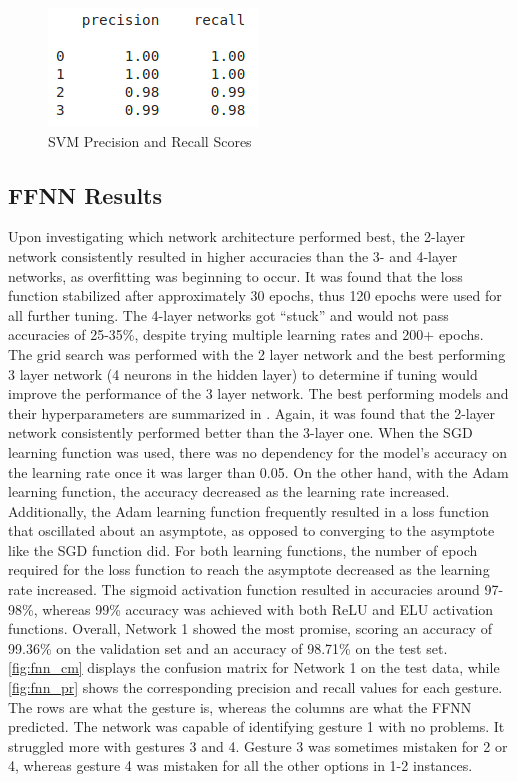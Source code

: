 \documentclass[journal]{IEEEtran}
\begin{document}
	\begin{figure}[!t]
		\centering
		\includegraphics[width=0.46\linewidth]{SVM_prec_rec}
		\caption{SVM Precision and Recall Scores}
		\label{fig:svm_pr}
	\end{figure}
	
	\subsection{FFNN Results}
	Upon investigating which network architecture performed best, the 2-layer network consistently resulted in higher accuracies than the 3- and 4-layer networks, as overfitting was beginning to occur. It was found that the loss function stabilized after approximately 30 epochs, thus 120 epochs were used for all further tuning. The 4-layer networks got “stuck” and would not pass accuracies of 25-35\%, despite trying multiple learning rates and 200+ epochs. The grid search was performed with the 2 layer network and the best performing 3 layer network (4 neurons in the hidden layer) to determine if tuning would improve the performance of the 3 layer network. The best performing models and their hyperparameters are summarized in . Again, it was found that the 2-layer network consistently performed better than the 3-layer one. When the SGD learning function was used, there was no dependency for the model’s accuracy on the learning rate once it was larger than 0.05. On the other hand, with the Adam learning function, the accuracy decreased as the learning rate increased. Additionally, the Adam learning function frequently resulted in a loss function that oscillated about an asymptote, as opposed to converging to the asymptote like the SGD function did. For both learning functions, the number of epoch required for the loss function to reach the asymptote decreased as the learning rate increased. The sigmoid activation function resulted in accuracies around 97-98\%, whereas 99\% accuracy was achieved with both ReLU and ELU activation functions. Overall, Network 1 showed the most promise, scoring an accuracy of 99.36\% on the validation set and an accuracy of 98.71\% on the test set. \cref{fig:fnn_cm} displays the confusion matrix for Network 1 on the test data, while \cref{fig:fnn_pr} shows the corresponding precision and recall values for each gesture. The rows are what the gesture is, whereas the columns are what the FFNN predicted. The network was capable of identifying gesture 1 with no problems. It struggled more with gestures 3 and 4. Gesture 3 was sometimes mistaken for 2 or 4, whereas gesture 4 was mistaken for all the other options in 1-2 instances.
	
\end{document}
